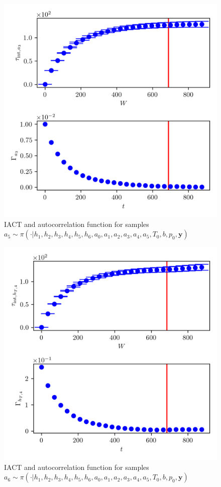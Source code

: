 \begin{figure}[ht!]
	\centering
	\includegraphics{UwerrTauIntTWalk11.png}
	\caption[IACT and autocorrelation function for $a_5$ samples.]{IACT and autocorrelation function for samples $a_5 \sim \pi( \cdot | h_1, h_2,h_3,h_4,h_5,h_6,a_0,a_1,a_2,a_3,a_4,a_5,T_0,b,p_0,  \bm{y})$}
	\label{fig:}
\end{figure}
\begin{figure}[ht!]
	\centering
	\includegraphics{UwerrTauIntTWalk12.png}
	\caption[IACT and autocorrelation function for $a_6$ samples.]{IACT and autocorrelation function for samples $a_6 \sim \pi( \cdot | h_1, h_2,h_3,h_4,h_5,h_6,a_0,a_1,a_2,a_3,a_4,a_5,T_0,b,p_0,  \bm{y})$}
	\label{fig:}
\end{figure}
